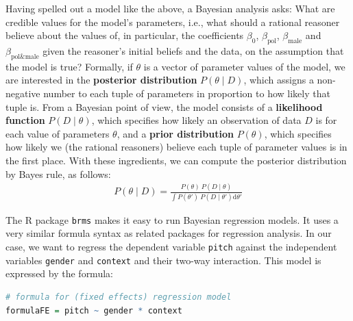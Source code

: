 \documentclass[nobib]{tufte-handout}
\begin{document}
Having spelled out a model like the above, a Bayesian analysis asks: What are credible values for the model's parameters, i.e., what should a rational reasoner believe about the values of,
in particular, the coefficients $\beta_0$, $\beta_{\text{pol}}$, $\beta_{\text{male}}$ and $\beta_{\text{pol\&male}}$ given the reasoner's initial beliefs and the data, on the assumption that the model is true?
%
%
Formally, if $\theta$ is a vector of parameter values of the model, we are interested in the \textbf{posterior distribution} $P(\theta \mid D)$, which assigns a non-negative number to each tuple of parameters in proportion to how likely that tuple is.
From a Bayesian point of view, the model consists of a \textbf{likelihood function} $P(D \mid \theta)$, which specifies how likely an observation of data $D$ is for each value of parameters $\theta$, and a \textbf{prior distribution} $P(\theta)$, which specifies how likely we (the rational reasoners) believe each tuple of parameter values is in the first place.
%
%
With these ingredients, we can compute the posterior distribution by Bayes rule, as follows:
\begin{eqnarray*}
  P(\theta \mid D) = \frac{P(\theta) \ P(D \mid \theta)}{ \int P(\theta') \ P(D \mid
  \theta') \textrm{d}\theta'}
\end{eqnarray*}

The R package \texttt{brms} \citep{buerkner2016brms} makes it easy to run Bayesian regression models. It uses a very similar formula syntax as related packages for regression analysis. In our case, we want to regress the dependent variable \texttt{pitch} against the independent variables \texttt{gender} and \texttt{context} and their two-way interaction. This model is expressed by the formula:

\bigskip

\begin{minipage}[]{\textwidth}
\begin{lstlisting}[language=R]
# formula for (fixed effects) regression model
formulaFE = pitch ~ gender * context
\end{lstlisting}
\end{minipage}
\end{document}
